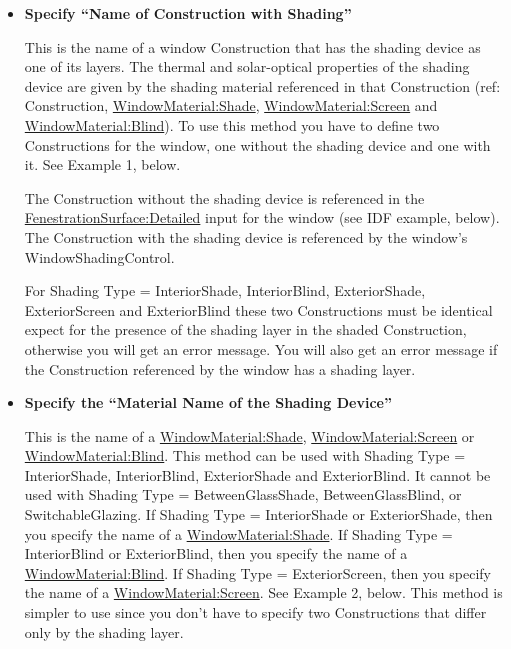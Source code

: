 \begin{itemize}
  \item
\textbf{Specify ``Name of Construction with Shading''}

This is the name of a window Construction that has the shading device as one of its layers. The thermal and solar-optical properties of the shading device are given by the shading material referenced in that Construction (ref: Construction, \hyperref[windowmaterialshade]{WindowMaterial:Shade}, \hyperref[windowmaterialscreen]{WindowMaterial:Screen} and \hyperref[windowmaterialblind]{WindowMaterial:Blind}). To use this method you have to define two Constructions for the window, one without the shading device and one with it. See Example 1, below.

The Construction without the shading device is referenced in the \hyperref[fenestrationsurfacedetailed]{FenestrationSurface:Detailed} input for the window (see IDF example, below). The Construction with the shading device is referenced by the window's WindowShadingControl.

For Shading Type = InteriorShade, InteriorBlind, ExteriorShade, ExteriorScreen and ExteriorBlind these two Constructions must be identical expect for the presence of the shading layer in the shaded Construction, otherwise you will get an error message. You will also get an error message if the Construction referenced by the window has a shading layer.

  \item
\textbf{Specify the ``Material Name of the Shading Device''}

This is the name of a \hyperref[windowmaterialshade]{WindowMaterial:Shade}, \hyperref[windowmaterialscreen]{WindowMaterial:Screen} or \hyperref[windowmaterialblind]{WindowMaterial:Blind}. This method can be used with Shading Type = InteriorShade, InteriorBlind, ExteriorShade and ExteriorBlind. It cannot be used with Shading Type = BetweenGlassShade, BetweenGlassBlind, or SwitchableGlazing. If Shading Type = InteriorShade or ExteriorShade, then you specify the name of a \hyperref[windowmaterialshade]{WindowMaterial:Shade}. If Shading Type = InteriorBlind or ExteriorBlind, then you specify the name of a \hyperref[windowmaterialblind]{WindowMaterial:Blind}. If Shading Type = ExteriorScreen, then you specify the name of a \hyperref[windowmaterialscreen]{WindowMaterial:Screen}. See Example 2, below. This method is simpler to use since you don't have to specify two Constructions that differ only by the shading layer.


\end{itemize}
